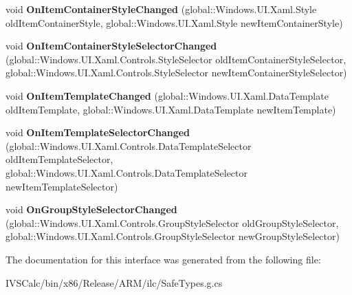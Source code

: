 \begin{DoxyCompactItemize}
void {\bfseries On\+Item\+Container\+Style\+Changed} (global\+::\+Windows.\+U\+I.\+Xaml.\+Style old\+Item\+Container\+Style, global\+::\+Windows.\+U\+I.\+Xaml.\+Style new\+Item\+Container\+Style)
\item 
\mbox{\label{interface_windows_1_1_u_i_1_1_xaml_1_1_controls_1_1_i_items_control_overrides_a4d197dd9f2dbb42d5ba7828014c6d966}} 
void {\bfseries On\+Item\+Container\+Style\+Selector\+Changed} (global\+::\+Windows.\+U\+I.\+Xaml.\+Controls.\+Style\+Selector old\+Item\+Container\+Style\+Selector, global\+::\+Windows.\+U\+I.\+Xaml.\+Controls.\+Style\+Selector new\+Item\+Container\+Style\+Selector)
\item 
\mbox{\label{interface_windows_1_1_u_i_1_1_xaml_1_1_controls_1_1_i_items_control_overrides_ac592214833c559a28551ba9ccb0b4d2a}} 
void {\bfseries On\+Item\+Template\+Changed} (global\+::\+Windows.\+U\+I.\+Xaml.\+Data\+Template old\+Item\+Template, global\+::\+Windows.\+U\+I.\+Xaml.\+Data\+Template new\+Item\+Template)
\item 
\mbox{\label{interface_windows_1_1_u_i_1_1_xaml_1_1_controls_1_1_i_items_control_overrides_a30660077603ff4ebf8b8f749780afbd1}} 
void {\bfseries On\+Item\+Template\+Selector\+Changed} (global\+::\+Windows.\+U\+I.\+Xaml.\+Controls.\+Data\+Template\+Selector old\+Item\+Template\+Selector, global\+::\+Windows.\+U\+I.\+Xaml.\+Controls.\+Data\+Template\+Selector new\+Item\+Template\+Selector)
\item 
\mbox{\label{interface_windows_1_1_u_i_1_1_xaml_1_1_controls_1_1_i_items_control_overrides_ac04335f529637477b2da0ba46ef61142}} 
void {\bfseries On\+Group\+Style\+Selector\+Changed} (global\+::\+Windows.\+U\+I.\+Xaml.\+Controls.\+Group\+Style\+Selector old\+Group\+Style\+Selector, global\+::\+Windows.\+U\+I.\+Xaml.\+Controls.\+Group\+Style\+Selector new\+Group\+Style\+Selector)
\end{DoxyCompactItemize}


The documentation for this interface was generated from the following file\+:\begin{DoxyCompactItemize}
\item 
I\+V\+S\+Calc/bin/x86/\+Release/\+A\+R\+M/ilc/Safe\+Types.\+g.\+cs\end{DoxyCompactItemize}
